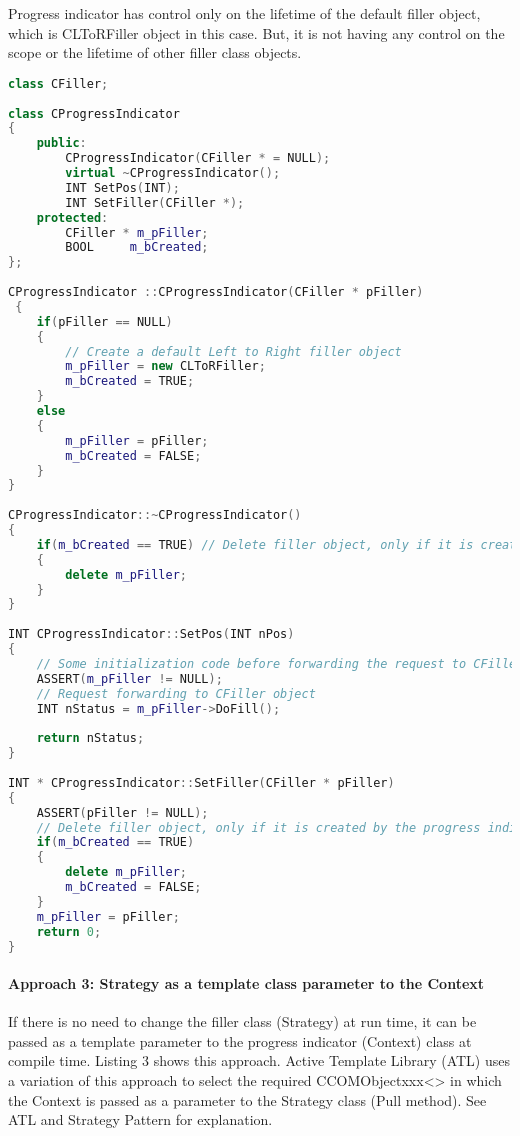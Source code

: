 \documentclass{book}
\begin{document}
    Progress indicator has control only on the lifetime of the default filler object, which is CLToRFiller object in this case.
    But, it is not having any control on the scope or the lifetime of other filler class objects. 
\begin{lstlisting}[caption={Strategy Pattern Sample 4: 2 - Strategy object as an \textcolor{red}{optional} parameter to the Context}, language=C++]
class CFiller;
 
class CProgressIndicator
{
	public:
		CProgressIndicator(CFiller * = NULL);
		virtual ~CProgressIndicator();
		INT SetPos(INT);
		INT SetFiller(CFiller *);
	protected:
		CFiller * m_pFiller;
		BOOL	 m_bCreated;
};
 
CProgressIndicator ::CProgressIndicator(CFiller * pFiller)
 {
	if(pFiller == NULL)
	{
		// Create a default Left to Right filler object
		m_pFiller = new CLToRFiller;
		m_bCreated = TRUE;
	}
	else
	{
		m_pFiller = pFiller;
		m_bCreated = FALSE;
	}
}
 
CProgressIndicator::~CProgressIndicator()
{
	if(m_bCreated == TRUE) // Delete filler object, only if it is created by the progress indicator
	{
		delete m_pFiller;
	}
}
 
INT CProgressIndicator::SetPos(INT nPos)
{
	// Some initialization code before forwarding the request to CFiller object
	ASSERT(m_pFiller != NULL);
	// Request forwarding to CFiller object
	INT nStatus = m_pFiller->DoFill();
			
	return nStatus;
}
 
INT * CProgressIndicator::SetFiller(CFiller * pFiller)
{
	ASSERT(pFiller != NULL);
	// Delete filler object, only if it is created by the progress indicator
	if(m_bCreated == TRUE)
	{
		delete m_pFiller;
		m_bCreated = FALSE;
	}
	m_pFiller = pFiller;
	return 0;
}
\end{lstlisting}
\paragraph{Approach 3: Strategy as a template class parameter to the Context}

If there is no need to change the filler class (Strategy) at run time, it can be passed as a template parameter to the progress indicator (Context) class at compile time.
Listing 3 shows this approach.
Active Template Library (ATL) uses a variation of this approach to select the required CCOMObjectxxx<> in which the Context is passed as a parameter to the Strategy class (Pull method).
See ATL and Strategy Pattern for explanation.
\end{document}
